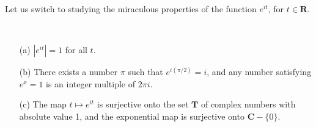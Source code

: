 Let us switch to studying the miraculous properties of the function $e^{it}$, for $t \in \mathbf{R}$.

\begin{theorem}\ 
    \begin{enumerate}
        \item[(a)] $|e^{it}| = 1$ for all $t$.
        \item[(b)] There exists a number $\pi$ such that $e^{i(\pi/2)} = i$, and any number satisfying $e^{x} = 1$ is an integer multiple of $2 \pi i$.
        \item[(c)] The map $t \mapsto e^{it}$ is surjective onto the set $\mathbf{T}$ of complex numbers with absolute value 1, and the exponential map is surjective onto $\mathbf{C} - \{ 0 \}$.
    \end{enumerate}
\end{theorem}
